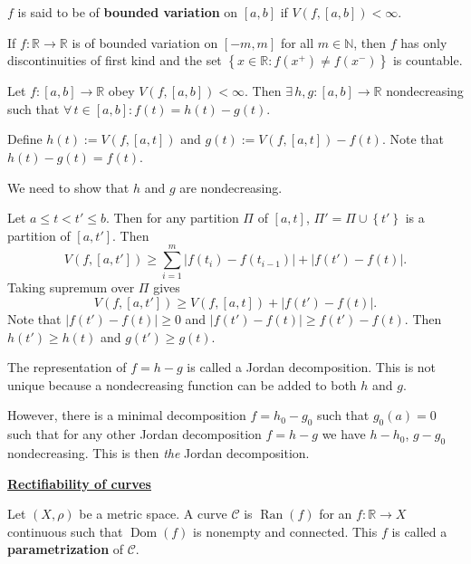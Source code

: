 \documentclass{notes}
\begin{document}
\begin{defn}
  $f$ is said to be of {\boldmath \bfseries bounded variation} on $[a, b]$ if $V(f, [a, b]) < \infty$.
\end{defn}

\begin{lem}
  If $f \colon \mathbb R \to \mathbb R$ is of bounded variation on $[-m, m]$ for all $m \in \mathbb N$, then $f$ has only discontinuities of first kind and the set $\left \{ x \in \mathbb R : f(x^+) \neq f(x^-) \right \}$ is countable.
\end{lem}

\begin{thm}
  Let $f \colon [a, b] \to \mathbb R$ obey $V(f, [a, b]) < \infty$.
  Then $\exists \, h, g \colon [a, b] \to \mathbb R$ nondecreasing such that $\forall \, t \in [a, b]: f(t) = h(t) - g(t)$.
\end{thm}

\begin{prf}
  Define $h(t) := V(f, [a, t])$ and $g(t) := V(f, [a, t]) - f(t)$.
  Note that $h(t) - g(t) = f(t)$.

  We need to show that $h$ and $g$ are nondecreasing.
  
  Let $a \leq t < t' \leq b$.
  Then for any partition $\Pi$ of $[a, t]$, $\Pi' = \Pi \cup \left \{ t' \right \}$ is a partition of $[a, t']$.
  Then 
  \[
    V(f, [a, t']) \geq \sum_{i = 1}^m \left | f(t_i) - f(t_{i - 1}) \right | + \left | f(t') - f(t) \right |.
  \]
  Taking supremum over $\Pi$ gives 
  \[
    V(f, [a, t']) \geq V(f, [a, t]) + \left | f(t') - f(t) \right |.
  \]
  Note that $\left | f(t') - f(t) \right | \geq 0$ and $\left | f(t') - f(t) \right | \geq f(t') - f(t)$.
  Then $h(t') \geq h(t)$ and $g(t') \geq g(t)$.
\end{prf}

\strut

The representation of $f = h - g$ is called a Jordan decomposition.
This is not unique because a nondecreasing function can be added to both $h$ and $g$.

However, there is a minimal decomposition $f = h_{0} - g_{0}$ such that $g_0(a) = 0$ such that for any other Jordan decomposition $f = h - g$ we have $h - h_0$, $g - g_0$ nondecreasing.
This is then \textit{the} Jordan decomposition.

\strut

\underline{{\boldmath \bfseries Rectifiability of curves}}

\begin{defn}
  Let $(X, \rho)$ be a metric space.
  A curve $\mathcal C$ is $\operatorname{Ran}(f)$ for an $f \colon \mathbb R \to X$ continuous such that $\operatorname{Dom}(f)$ is nonempty and connected.
  This $f$ is called a {\boldmath \bfseries parametrization} of $\mathcal C$.
\end{defn}
\end{document}
